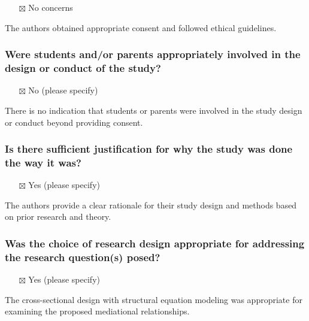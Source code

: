 \documentclass[
  doc, a4paper]{apa7}
\providecommand{\tightlist}{%
  \setlength{\itemsep}{0pt}\setlength{\parskip}{0pt}}
\begin{document}
\begin{itemize}
\tightlist
\item[$\boxtimes$]
  No concerns
\end{itemize}

The authors obtained appropriate consent and followed ethical guidelines.

\subsubsection{Were students and/or parents appropriately involved in the design or conduct of the study?}\label{were-students-andor-parents-appropriately-involved-in-the-design-or-conduct-of-the-study}

\begin{itemize}
\tightlist
\item[$\boxtimes$]
  No (please specify)
\end{itemize}

There is no indication that students or parents were involved in the study design or conduct beyond providing consent.

\subsubsection{Is there sufficient justification for why the study was done the way it was?}\label{is-there-sufficient-justification-for-why-the-study-was-done-the-way-it-was}

\begin{itemize}
\tightlist
\item[$\boxtimes$]
  Yes (please specify)
\end{itemize}

The authors provide a clear rationale for their study design and methods based on prior research and theory.

\subsubsection{Was the choice of research design appropriate for addressing the research question(s) posed?}\label{was-the-choice-of-research-design-appropriate-for-addressing-the-research-questions-posed}

\begin{itemize}
\tightlist
\item[$\boxtimes$]
  Yes (please specify)
\end{itemize}

The cross-sectional design with structural equation modeling was appropriate for examining the proposed mediational relationships.
\end{document}
